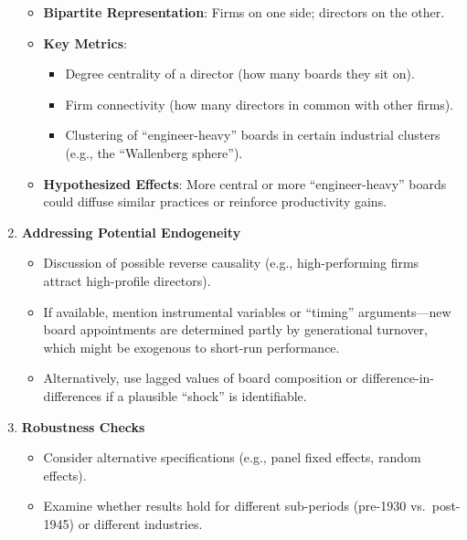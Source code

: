 \documentclass[
]{article}
\providecommand{\tightlist}{%
  \setlength{\itemsep}{0pt}\setlength{\parskip}{0pt}}\usepackage{longtable,booktabs,array}
\begin{document}
\begin{enumerate}
  \begin{itemize}
  \tightlist
  \item
    \textbf{Bipartite Representation}: Firms on one side; directors on
    the other.\\
  \item
    \textbf{Key Metrics}:

    \begin{itemize}
    \tightlist
    \item
      Degree centrality of a director (how many boards they sit on).\\
    \item
      Firm connectivity (how many directors in common with other
      firms).\\
    \item
      Clustering of ``engineer-heavy'' boards in certain industrial
      clusters (e.g., the ``Wallenberg sphere'').\\
    \end{itemize}
  \item
    \textbf{Hypothesized Effects}: More central or more
    ``engineer-heavy'' boards could diffuse similar practices or
    reinforce productivity gains.
  \end{itemize}
\item
  \textbf{Addressing Potential Endogeneity}

  \begin{itemize}
  \tightlist
  \item
    Discussion of possible reverse causality (e.g., high-performing
    firms attract high-profile directors).\\
  \item
    If available, mention instrumental variables or ``timing''
    arguments---new board appointments are determined partly by
    generational turnover, which might be exogenous to short-run
    performance.\\
  \item
    Alternatively, use lagged values of board composition or
    difference-in-differences if a plausible ``shock'' is identifiable.
  \end{itemize}
\item
  \textbf{Robustness Checks}

  \begin{itemize}
  \tightlist
  \item
    Consider alternative specifications (e.g., panel fixed effects,
    random effects).\\
  \item
    Examine whether results hold for different sub-periods (pre-1930
    vs.~post-1945) or different industries.
  \end{itemize}
\end{enumerate}
\end{document}
